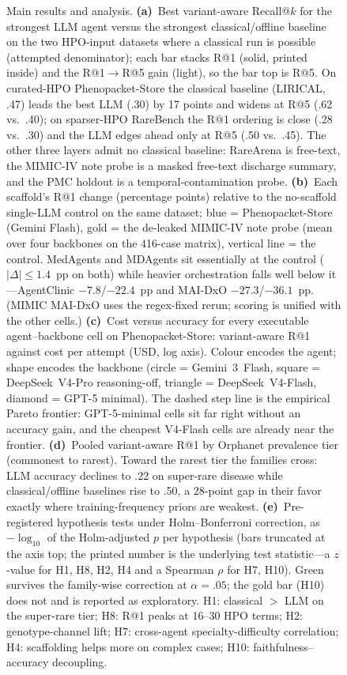 \documentclass[letterpaper]{article} %
\begin{document}
\begin{figure}[t]
\caption{Main results and analysis.
\textbf{(a)}~Best variant-aware Recall@$k$ for the strongest LLM agent versus the strongest classical/offline baseline on the two HPO-input datasets where a classical run is possible (attempted denominator); each bar stacks R@1 (solid, printed inside) and the R@1$\rightarrow$R@5 gain (light), so the bar top is R@5. On curated-HPO Phenopacket-Store the classical baseline (LIRICAL, .47) leads the best LLM (.30) by 17 points and widens at R@5 (.62 vs.\ .40); on sparser-HPO RareBench the R@1 ordering is close (.28 vs.\ .30) and the LLM edges ahead only at R@5 (.50 vs.\ .45). The other three layers admit no classical baseline: RareArena is free-text, the MIMIC-IV note probe is a masked free-text discharge summary, and the PMC holdout is a temporal-contamination probe.
\textbf{(b)}~Each scaffold's R@1 change (percentage points) relative to the no-scaffold single-LLM control on the same dataset; blue = Phenopacket-Store (Gemini Flash), gold = the de-leaked MIMIC-IV note probe (mean over four backbones on the 416-case matrix), vertical line = the control. MedAgents and MDAgents sit essentially at the control ($|\Delta|\!\le\!1.4$~pp on both) while heavier orchestration falls well below it---AgentClinic $-7.8$/$-22.4$~pp and MAI-DxO $-27.3$/$-36.1$~pp. (MIMIC MAI-DxO uses the regex-fixed rerun; scoring is unified with the other cells.)
\textbf{(c)}~Cost versus accuracy for every executable agent--backbone cell on Phenopacket-Store: variant-aware R@1 against cost per attempt (USD, log axis). Colour encodes the agent; shape encodes the backbone (circle = Gemini~3~Flash, square = DeepSeek~V4-Pro reasoning-off, triangle = DeepSeek~V4-Flash, diamond = GPT-5 minimal). The dashed step line is the empirical Pareto frontier: GPT-5-minimal cells sit far right without an accuracy gain, and the cheapest V4-Flash cells are already near the frontier.
\textbf{(d)}~Pooled variant-aware R@1 by Orphanet prevalence tier (commonest to rarest). Toward the rarest tier the families cross: LLM accuracy declines to .22 on super-rare disease while classical/offline baselines rise to .50, a 28-point gap in their favor exactly where training-frequency priors are weakest.
\textbf{(e)}~Pre-registered hypothesis tests under Holm--Bonferroni correction, as $-\log_{10}$ of the Holm-adjusted $p$ per hypothesis (bars truncated at the axis top; the printed number is the underlying test statistic---a $z$-value for H1, H8, H2, H4 and a Spearman $\rho$ for H7, H10). Green survives the family-wise correction at $\alpha{=}.05$; the gold bar (H10) does not and is reported as exploratory. H1: classical $>$ LLM on the super-rare tier; H8: R@1 peaks at 16--30 HPO terms; H2: genotype-channel lift; H7: cross-agent specialty-difficulty correlation; H4: scaffolding helps more on complex cases; H10: faithfulness--accuracy decoupling.
}
\end{figure}
\end{document}
